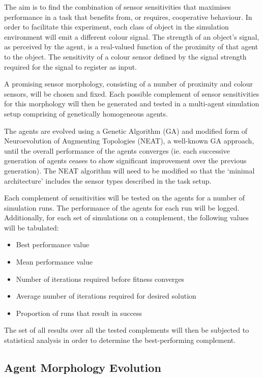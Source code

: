 \documentclass[a4paper,12pt]{article}
\begin{document}
The aim is to find the combination of sensor sensitivities that maximises performance in a task that benefits from, or requires, cooperative behaviour. In order to facilitate this experiment, each class of object in the simulation environment will emit a different colour signal. The strength of an object's signal, as perceived by the agent, is a real-valued function of the proximity of that agent to the object. The sensitivity of a colour sensor defined by the signal strength required for the signal to register as input.

A promising sensor morphology, consisting of a number of proximity and colour sensors, will be chosen and fixed. Each possible complement of sensor sensitivities for this morphology will then be generated and tested in a multi-agent simulation setup comprising of genetically homogeneous agents.

The agents are evolved using a Genetic Algorithm (GA) and modified form of Neuroevolution of Augmenting Topologies (NEAT), a well-known GA approach\cite{Stanley02}, until the overall performance of the agents converges (ie. each successive generation of agents ceases to show significant improvement over the previous generation). The NEAT algorithm will need to be modified so that the ‘minimal architecture’ includes the sensor types described in the task setup.

Each complement of sensitivities will be tested on the agents for a number of simulation runs. The performance of the agents for each run will be logged. Additionally, for each set of simulations on a complement, the following values will be tabulated:
\begin{itemize}
\item Best performance value
\item Mean performance value
\item Number of iterations required before fitness converges
\item Average number of iterations required for desired solution
\item Proportion of runs that result in success
\end{itemize}

The set of all results over all the tested complements will then be subjected to statistical analysis in order to determine the best-performing complement.

\subsection{Agent Morphology Evolution}
\end{document}
